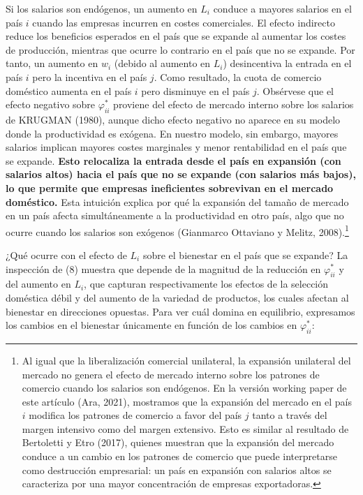 \documentclass[10pt,a4paper]{article}
\begin{document}
Si los salarios son endógenos, un aumento en $L_i$ conduce a mayores salarios en el país $i$ cuando las empresas incurren en costes comerciales. El efecto indirecto reduce los beneficios esperados en el país que se expande al aumentar los costes de producción, mientras que ocurre lo contrario en el país que no se expande. Por tanto, un aumento en $w_i$ (debido al aumento en $L_i$) desincentiva la entrada en el país $i$ pero la incentiva en el país $j$. Como resultado, la cuota de comercio doméstico aumenta en el país $i$ pero disminuye en el país $j$. Obsérvese que el efecto negativo sobre $\varphi_{ii}^*$ proviene del efecto de mercado interno sobre los salarios de KRUGMAN (1980), aunque dicho efecto negativo no aparece en su modelo donde la productividad es exógena. En nuestro modelo, sin embargo, mayores salarios implican mayores costes marginales y menor rentabilidad en el país que se expande. \textbf{Esto relocaliza la entrada desde el país en expansión (con salarios altos) hacia el país que no se expande (con salarios más bajos), lo que permite que empresas ineficientes sobrevivan en el mercado doméstico.} Esta intuición explica por qué la expansión del tamaño de mercado en un país afecta simultáneamente a la productividad en otro país, algo que no ocurre cuando los salarios son exógenos (Gianmarco Ottaviano y Melitz, 2008).\footnote{%
    Al igual que la liberalización comercial unilateral, la expansión unilateral del mercado no genera el efecto de mercado interno sobre los patrones de comercio cuando los salarios son endógenos. En la versión working paper de este artículo (Ara, 2021), mostramos que la expansión del mercado en el país $i$ modifica los patrones de comercio a favor del país $j$ tanto a través del margen intensivo como del margen extensivo. Esto es similar al resultado de Bertoletti y Etro (2017), quienes muestran que la expansión del mercado conduce a un cambio en los patrones de comercio que puede interpretarse como destrucción empresarial: un país en expansión con salarios altos se caracteriza por una mayor concentración de empresas exportadoras.
}

¿Qué ocurre con el efecto de $L_i$ sobre el bienestar en el país que se expande? La inspección de (8) muestra que depende de la magnitud de la reducción en $\varphi_{ii}^*$ y del aumento en $L_i$, que capturan respectivamente los efectos de la selección doméstica débil y del aumento de la variedad de productos, los cuales afectan al bienestar en direcciones opuestas. Para ver cuál domina en equilibrio, expresamos los cambios en el bienestar únicamente en función de los cambios en $\varphi_{ii}^*$:
\end{document}
